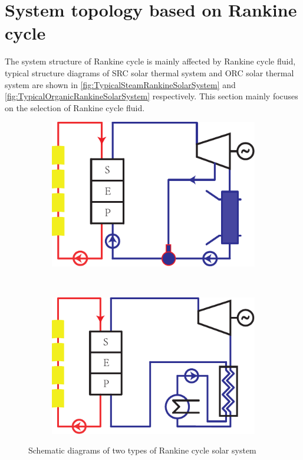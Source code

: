 \section{System topology based on Rankine cycle}
\label{sec:strc}

The system structure of Rankine cycle is mainly affected by Rankine cycle fluid, typical structure diagrams of SRC solar thermal system and ORC solar thermal system are shown in \autoref{fig:TypicalSteamRankineSolarSystem} and \autoref{fig:TypicalOrganicRankineSolarSystem} respectively. This section mainly focuses on the selection of Rankine cycle fluid.

\begin{figure}[htbp]
\centering
	\begin{subfigure}[b]{0.4\columnwidth}
	\includegraphics[width = \columnwidth]{fig/TypicalSteamRankineSolarSystem}
	\caption{}\label{fig:TypicalSteamRankineSolarSystem}
	\end{subfigure}
	~
\begin{subfigure}[b]{0.4\columnwidth}
	\includegraphics[width = \columnwidth]{fig/TypicalOrganicRankineSolarSystem}
	\caption{}\label{fig:TypicalOrganicRankineSolarSystem}
	\end{subfigure}
	\caption{Schematic diagrams of two types of Rankine cycle solar system}
	\label{fig:TwoTypesOfRankineCycle}
\end{figure}

